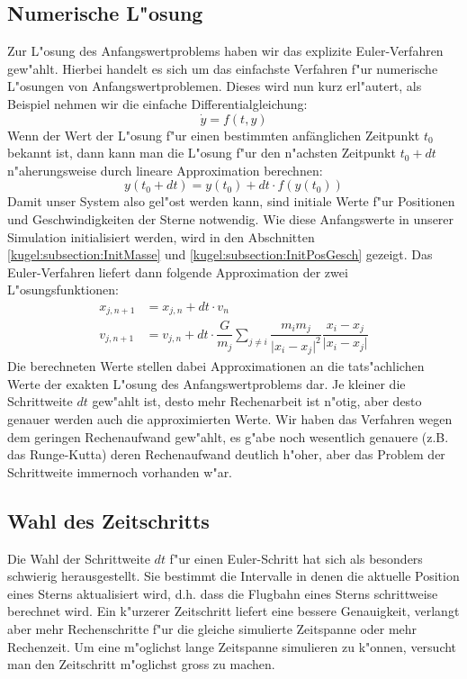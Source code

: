 \begin{refsection}
\subsection{Numerische L"osung}
Zur L"osung des Anfangswertproblems haben wir das explizite
Euler-Verfahren gew"ahlt. Hierbei handelt es sich um das einfachste
Verfahren f"ur numerische L"osungen von Anfangswertproblemen. Dieses
wird nun kurz erl"autert, als Beispiel nehmen wir die einfache
Differentialgleichung:
\begin{equation}
\dot{y} = f(t,y)
\label{kugel:Formel:DGLbsp}
\end{equation}
Wenn der Wert der L"osung f"ur einen bestimmten anfänglichen Zeitpunkt
$t_0$ bekannt ist, dann kann man die L"osung f"ur den n"achsten Zeitpunkt
$t_0 + dt$ n"aherungsweise durch lineare Approximation berechnen:
\begin{equation}
y(t_0 + dt) = y(t_0) + dt \cdot f(y(t_0))
\label{kugel:Formel:EulerAllg}
\end{equation}
Damit unser System also gel"ost werden kann, sind initiale Werte f"ur
Positionen und Geschwindigkeiten der Sterne notwendig.
Wie diese Anfangswerte in unserer Simulation initialisiert werden,
wird in den Abschnitten \ref{kugel:subsection:InitMasse} und
\ref{kugel:subsection:InitPosGesch} gezeigt. Das Euler-Verfahren liefert
dann folgende Approximation der zwei L"osungsfunktionen:
\begin{equation}   
\begin{aligned}
x_{j,n+1} &=  x_{j,n} + dt \cdot  v_n \\
     v_{j,n+1} &=  v_{j,n} + dt \cdot \dfrac{G}{m_j} \sum_{j \neq i} \dfrac{m_i m_j}{\lvert x_i - x_j \lvert^2} \dfrac{x_i - x_j}{\lvert x_i - x_j \lvert}
\end{aligned}
\label{kugel:Formel:EulerSys}
\end{equation}
Die berechneten Werte stellen dabei Approximationen an die tats"achlichen
Werte der exakten L"osung des Anfangswertproblems dar. Je kleiner die
Schrittweite $dt$ gew"ahlt ist, desto mehr Rechenarbeit ist n"otig,
aber desto genauer werden auch die approximierten Werte.
Wir haben das Verfahren wegen dem geringen Rechenaufwand gew"ahlt, es
g"abe noch wesentlich genauere (z.B. das Runge-Kutta) deren Rechenaufwand
deutlich h"oher, aber das Problem der Schrittweite immernoch vorhanden
w"ar.

\subsection{Wahl des Zeitschritts}
Die Wahl der Schrittweite $dt$ f"ur einen Euler-Schritt hat sich
als besonders schwierig herausgestellt. Sie bestimmt die Intervalle
in denen die aktuelle Position eines Sterns aktualisiert wird,
d.h. dass die Flugbahn eines Sterns schrittweise berechnet wird. Ein
k"urzerer Zeitschritt liefert eine bessere Genauigkeit, verlangt aber
mehr Rechenschritte f"ur die gleiche simulierte Zeitspanne oder mehr
Rechenzeit. Um eine m"oglichst lange Zeitspanne simulieren zu k"onnen,
versucht man den Zeitschritt m"oglichst gross zu machen.
    

\end{refsection}
